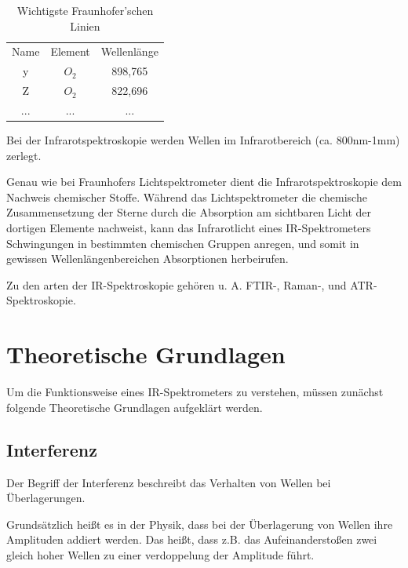 \documentclass{article}
\begin{document}
\begin{table}
    \label{tab:wichtige-fraunhoferlinien}
    \begin{tabular}{|c|c|c|}
        \hline
        Name & Element & Wellenlänge \\
        y    & $O_2$    & 898,765    \\
        Z    & $O_2$    & 822,696    \\
        ...  & ...      & ...        \\ %
        \hline
    \end{tabular}
    \caption{Wichtigste Fraunhofer'schen Linien}
\end{table}

Bei der Infrarotspektroskopie werden Wellen im Infrarotbereich (ca. 800nm-1mm) zerlegt.

Genau wie bei Fraunhofers Lichtspektrometer dient die Infrarotspektroskopie dem Nachweis chemischer Stoffe. Während das Lichtspektrometer die chemische Zusammensetzung der Sterne durch die Absorption am sichtbaren Licht der dortigen Elemente nachweist, kann das Infrarotlicht eines IR-Spektrometers Schwingungen in bestimmten chemischen Gruppen anregen, und somit in gewissen Wellenlängenbereichen Absorptionen herbeirufen.

Zu den arten der IR-Spektroskopie gehören u. A. FTIR-, Raman-, und ATR-Spektroskopie.

\newpage
\section{Theoretische Grundlagen}

Um die Funktionsweise eines IR-Spektrometers zu verstehen, müssen zunächst folgende Theoretische Grundlagen aufgeklärt werden.

\subsection{Interferenz}

Der Begriff der Interferenz beschreibt das Verhalten von Wellen bei Überlagerungen.

Grundsätzlich heißt es in der Physik, dass bei der Überlagerung von Wellen ihre Amplituden addiert werden. Das heißt, dass z.B. das Aufeinanderstoßen zwei gleich hoher Wellen zu einer verdoppelung der Amplitude führt.
\end{document}
